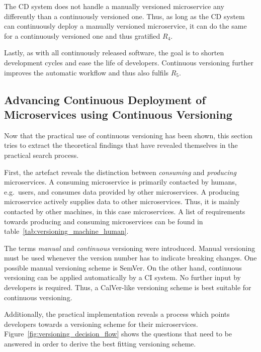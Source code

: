 The \ac{CD} system does not handle a manually versioned microservice any
differently than a continuously versioned one. Thus, as long as the \ac{CD}
system can continuously deploy a manually versioned microservice, it can do the
same for a continuously versioned one and thus gratified $R_4$.

Lastly, as with all continuously released software, the goal is to shorten
development cycles and ease the life of developers. Continuous versioning
further improves the automatic workflow and thus also fulfils $R_5$.

\subsection{Advancing Continuous Deployment of Microservices using Continuous Versioning}%
\label{sub:Advancing_Continuous_Deployment_of_Microservices_using_XXX_Versioning}
Now that the practical use of continuous versioning has been shown, this
section tries to extract the theoretical findings that have revealed themselves
in the practical search process.

First, the artefact reveals the distinction between \textit{consuming} and
\textit{producing} microservices. A consuming microservice is primarily
contacted by humans, e.g.\ users, and consumes data provided by other
microservices. A producing microservice actively supplies data to other
microservices. Thus, it is mainly contacted by other machines, in this case
microservices. A list of requirements towards producing and consuming
microservices can be found in table~\ref{tab:versioning_machine_human}.

The terms \textit{manual} and \textit{continuous} versioning were introduced.
Manual versioning must be used whenever the version number has to indicate
breaking changes. One possible manual versioning scheme is SemVer. On the other
hand, continuous versioning can be applied automatically by a \ac{CI} system.
No further input by developers is required. Thus, a CalVer-like versioning
scheme is best suitable for continuous versioning.

Additionally, the practical implementation reveals a process which points
developers towards a versioning scheme for their microservices.
Figure~\ref{fig:versioning_decision_flow} shows the questions that need to be
answered in order to derive the best fitting versioning scheme.

